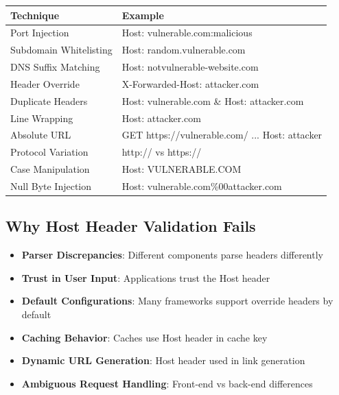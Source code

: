 \documentclass[12pt,a4paper]{article}
\begin{document}
\begin{longtable}{|p{5cm}|p{10cm}|}
    \hline
    \textbf{Technique} & \textbf{Example} \\
    \hline
    Port Injection & Host: vulnerable.com:malicious \\
    \hline
    Subdomain Whitelisting & Host: random.vulnerable.com \\
    \hline
    DNS Suffix Matching & Host: notvulnerable-website.com \\
    \hline
    Header Override & X-Forwarded-Host: attacker.com \\
    \hline
    Duplicate Headers & Host: vulnerable.com \& Host: attacker.com \\
    \hline
    Line Wrapping & \quad Host: attacker.com \\
    \hline
    Absolute URL & GET https://vulnerable.com/ ... Host: attacker \\
    \hline
    Protocol Variation & http:// vs https:// \\
    \hline
    Case Manipulation & Host: VULNERABLE.COM \\
    \hline
    Null Byte Injection & Host: vulnerable.com\%00attacker.com \\
    \hline
\end{longtable}

\subsection{Why Host Header Validation Fails}

\begin{itemize}
    \item \textbf{Parser Discrepancies}: Different components parse headers differently
    \item \textbf{Trust in User Input}: Applications trust the Host header
    \item \textbf{Default Configurations}: Many frameworks support override headers by default
    \item \textbf{Caching Behavior}: Caches use Host header in cache key
    \item \textbf{Dynamic URL Generation}: Host header used in link generation
    \item \textbf{Ambiguous Request Handling}: Front-end vs back-end differences
\end{itemize}

\end{document}
